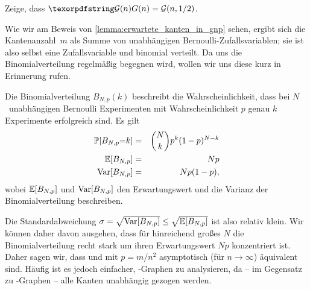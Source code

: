\begin{exercise}
    Zeige, dass $\Gn = \mathcal G(n, 1/2)$.
\end{exercise}

\bigskip

Wie wir am Beweis von \cref{lemma:erwartete_kanten_in_gnp} sehen, ergibt sich die Kantenanzahl~$m$ als Summe von unabhängigen Bernoulli-Zufallsvariablen;
sie ist also selbst eine Zufallsvariable und binomial verteilt.
Da uns die Binomialverteilung regelmäßig begegnen wird, wollen wir uns diese kurz in Erinnerung rufen.
\begin{definition}
    Die  Binomialverteilung $B_{N, p}(k)$ beschreibt die Wahrscheinlichkeit, dass bei $N$~unabhängigen Bernoulli Experimenten mit Wahrscheinlichkeit $p$ genau $k$ Experimente erfolgreich sind.
    Es gilt 
    \begin{eqnarray*}
        \mathbb{P}\!\left[B_{N,p} {=} k\right] &=& \binom{N}{k} p^k (1-p)^{N-k} \\
        \mathbb{E}\!\left[B_{N,p}\right] &=& Np \\
        \operatorname{Var}\!\left[B_{N,p}\right] &=& Np(1-p),
    \end{eqnarray*}
    wobei $\mathbb{E}\!\left[B_{N,p}\right]$ und $\operatorname{Var}\!\left[B_{N,p}\right]$ den Erwartungswert und die Varianz der Binomialverteilung beschreiben.
\end{definition}

Die Standardabweichung $\sigma = \sqrt{\operatorname{Var}\!\left[B_{N,p}\right]} \le \sqrt{\mathbb{E}\!\left[B_{N,p}\right]}$ ist also relativ klein.
Wir können daher davon ausgehen, dass für hinreichend großes $N$ die Binomialverteilung recht stark um ihren Erwartungswert $Np$ konzentriert ist.
Daher sagen wir, dass \Gnm und \Gnp mit $p=m/n^2$ asymptotisch (\dh für $n \to \infty$) äquivalent sind.
Häufig ist es jedoch einfacher, \Gnp-Graphen zu analysieren, da -- im Gegensatz zu \Gnm-Graphen -- alle Kanten unabhängig gezogen werden.

